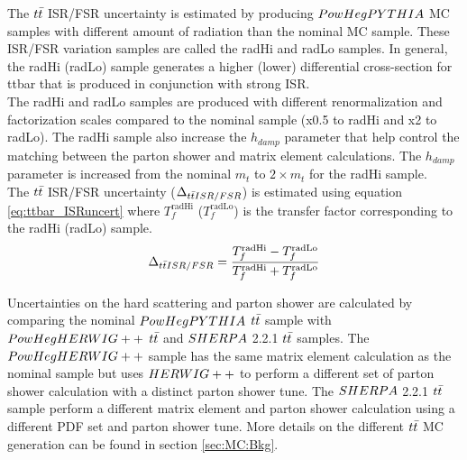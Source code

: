 
\indent  The $t\bar{t}$ ISR/FSR uncertainty is estimated by producing $PowHegPYTHIA$ MC samples with different amount of radiation than the nominal MC sample.  These ISR/FSR variation samples are called the radHi and radLo samples.  In general, the radHi (radLo) sample generates a higher (lower) differential cross-section for ttbar that is produced in conjunction with strong ISR. \\

\indent The radHi and radLo samples are produced with different renormalization and factorization scales compared to the nominal sample (x0.5 to radHi and x2 to radLo).   The radHi sample also increase the $h_{damp}$ parameter that help control the matching between the parton shower and matrix element calculations.  The $h_{damp}$ parameter is increased from the nominal $m_{t}$ to $2 \times m_{t}$ for the radHi sample.   \\

\indent The $t\bar{t}$ ISR/FSR uncertainty ($ \Delta_{t\bar{t} ISR/FSR} $) is estimated using equation \ref{eq:ttbar_ISRuncert} where $T_f^{\mathrm{radHi}}$ ($T_f^{\mathrm{radLo}}$) is the transfer factor corresponding to the radHi (radLo) sample. \\

\begin{eqnarray}
    \Delta_{t\bar{t} ISR/FSR} = \frac{T_f^{\mathrm{radHi}} - T_f^{\mathrm{radLo}}}{T_f^{\mathrm{radHi}} + T_f^{\mathrm{radLo}}}
    \label{eq:ttbar_ISRuncert}
\end{eqnarray}


\indent Uncertainties on the hard scattering and parton shower are calculated by comparing the nominal $PowHegPYTHIA$ $t\bar{t}$ sample with $PowHegHERWIG++$ $t\bar{t}$ and $SHERPA$ 2.2.1 $t\bar{t}$ samples.  The $PowHegHERWIG++$ sample has the same matrix element calculation as the nominal sample but uses $HERWIG++$ to perform a different set of parton shower calculation with a distinct parton shower tune.  The $SHERPA$ 2.2.1 $t\bar{t}$ sample perform a different matrix element and parton shower calculation using a different PDF set and parton shower tune.  More details on the different $t\bar{t}$ MC generation can be found in section \ref{sec:MC:Bkg}. \\

